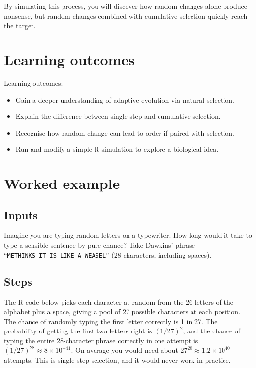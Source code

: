 \documentclass[
  a4paper]{book}
\providecommand{\tightlist}{%
  \setlength{\itemsep}{0pt}\setlength{\parskip}{0pt}}
\begin{document}
By simulating this process, you will discover how random changes alone produce nonsense, but random changes combined with cumulative selection quickly reach the target.

\section{Learning outcomes}\label{learning-outcomes}

Learning outcomes:

\begin{itemize}
\tightlist
\item
  Gain a deeper understanding of adaptive evolution via natural selection.
\item
  Explain the difference between single-step and cumulative selection.
\item
  Recognise how random change can lead to order if paired with selection.
\item
  Run and modify a simple R simulation to explore a biological idea.
\end{itemize}

\section{Worked example}\label{worked-example}

\subsection{Inputs}\label{inputs}

Imagine you are typing random letters on a typewriter. How long would it take to type a sensible sentence by pure chance? Take Dawkins' phrase ``\texttt{METHINKS\ IT\ IS\ LIKE\ A\ WEASEL}'' (28 characters, including spaces).

\subsection{Steps}\label{steps}

The R code below picks each character at random from the 26 letters of the alphabet plus a space, giving a pool of 27 possible characters at each position. The chance of randomly typing the first letter correctly is 1 in 27. The probability of getting the first two letters right is \((1/27)^2\), and the chance of typing the entire 28-character phrase correctly in one attempt is \((1/27)^{28} \approx 8 \times 10^{-41}\). On average you would need about \(27^{28} \approx 1.2 \times 10^{40}\) attempts. This is single-step selection, and it would never work in practice.
\end{document}
